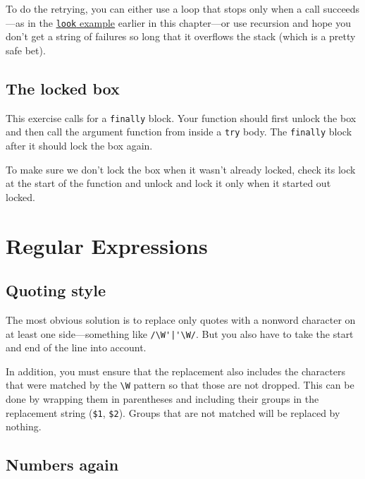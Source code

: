 To do the retrying, you can either use a loop that stops only when a call succeeds—as in the \hyperref[error.look]{\lstinline`look` example} earlier in this chapter—or use recursion and hope you don't get a string of failures so long that it overflows the stack (which is a pretty safe bet).

\subsection{The locked box}

This exercise calls for a \lstinline`finally` block. Your function should first unlock the box and then call the argument function from inside a \lstinline`try` body. The \lstinline`finally` block after it should lock the box again.

To make sure we don't lock the box when it wasn't already locked, check its lock at the start of the function and unlock and lock it only when it started out locked.

\section{Regular Expressions}

\subsection{Quoting style}

The most obvious solution is to replace only quotes with a nonword character on at least one side—something like \lstinline`/\W'|'\W/`. But you also have to take the start and end of the line into account.

In addition, you must ensure that the replacement also includes the characters that were matched by the \lstinline`\W` pattern so that those are not dropped. This can be done by wrapping them in parentheses and including their groups in the replacement string (\lstinline`$1`, \lstinline`$2`). Groups that are not matched will be replaced by nothing.

\subsection{Numbers again}

